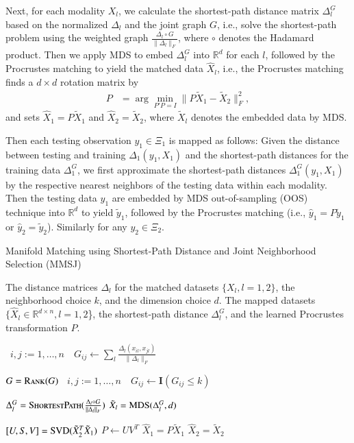 \documentclass[times,twocolumn,final]{elsarticle}
\newcommand{\Linefor}[2]{%
    \State \algorithmicfor\ {#1}\ \algorithmicdo\ {#2} \algorithmicend\ \algorithmicfor%
}
\newcommand{\rto}{\leftarrow}
\providecommand{\mb}[1]{\boldsymbol{#1}}
\begin{document}
Next, for each modality $X_{l}$, we calculate the shortest-path distance matrix $\Delta_{l}^{G}$ based on the normalized $\Delta_{l}$ and the joint graph $G$, i.e., solve the shortest-path problem using the weighted graph $\frac{\Delta_{l} \circ G }{\|\Delta_{l}\|_{F}}$, where $\circ$ denotes the Hadamard product. Then we apply MDS to embed $\Delta_{l}^{G}$ into $\mathbb{R}^{d}$ for each $l$, followed by the Procrustes matching to yield the matched data $\hat{X}_{l}$, i.e., the Procrustes matching finds a $d \times d$ rotation matrix by
\begin{align*}
P&=\arg\min_{P'P=I} \|P \tilde{X}_{1}-\tilde{X}_{2}\|_{F}^{2},
\end{align*}
and sets $\hat{X}_{1}=P \tilde{X}_{1}$ and $\hat{X}_{2}=\tilde{X}_{2}$, where $\tilde{X}_{l}$ denotes the embedded data by MDS.

Then each testing observation $y_{1} \in \Xi_{1}$ is mapped as follows: Given the distance between testing and training $\Delta_{1}(y_{1},X_{1})$ and the shortest-path distances for the training data $\Delta_{1}^{G}$, we first approximate the shortest-path distances $\Delta_{1}^{G}(y_{1},X_{1})$ by the respective nearest neighbors of the testing data within each modality. Then the testing data $y_{1}$ are embedded by MDS out-of-sampling (OOS) technique into $\mathbb{R}^{d}$ to yield $\tilde{y}_{1}$, followed by the Procrustes matching (i.e., $\hat{y}_{1}=P \tilde{y}_{1}$ or $\hat{y}_{2}=\tilde{y}_{2}$). Similarly for any $y_{2} \in \Xi_{2}$.

\begin{algorithm}
\caption{Manifold Matching using Shortest-Path Distance and Joint Neighborhood Selection (MMSJ)}
\label{alg1}
\begin{algorithmic}[1]
\Require The distance matrices $\Delta_{l}$ for the matched datasets $\{X_{l}, l=1,2\}$, the neighborhood choice $k$, and the dimension choice $d$.
\Ensure The mapped datasets $\{\hat{X}_{l} \in \mathbb{R}^{d \times n}, l=1,2$\}, the shortest-path distance $\Delta_{l}^{G}$, and the learned Procrustes transformation $P$.

\Linefor{$i,j:=1,\ldots,n$}{$G_{ij} \rto \sum_{l} \frac{\Delta_{l}(x_{il},x_{jl})}{\|\Delta_{l}\|_{F}}$} 
\State $G = \textsc{Rank}(G)$ 
\Linefor{$i,j:=1,\ldots,n$}{$G_{ij} \rto \mb{I}(G_{ij} \leq k)$} 
\State $\Delta_{l}^{G} = \textsc{ShortestPath}(\frac{\Delta_{l} \circ G }{\|\Delta_{l}\|_{F}})$ 
\State $\tilde{X}_{l}=\textsc{MDS}(\Delta_{l}^{G},d)$ 
\EndFor

\State $[U,S,V]=\textsc{SVD}(\tilde{X}_{2}^{T}\tilde{X}_{1})$
\State $P \rto UV^{T}$ 
\State $\hat{X}_{1}=P \tilde{X}_{1}$
\State $\hat{X}_{2}=\tilde{X}_{2}$
\EndFunction
\end{algorithmic}
\end{algorithm}
\end{document}
